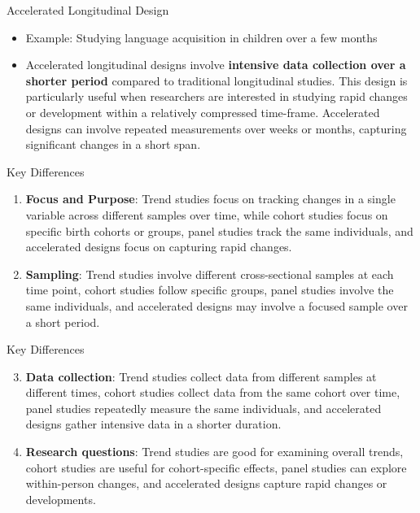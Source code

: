 \documentclass[
  ignorenonframetext,
  aspectratio=169,
]{beamer}
\providecommand{\tightlist}{%
  \setlength{\itemsep}{0pt}\setlength{\parskip}{0pt}}\usepackage{longtable,booktabs,array}
\begin{document}
\begin{frame}{Accelerated Longitudinal Design}
\label{accelerated-longitudinal-design}
\begin{itemize}[<+->]
\tightlist
\item
  Example: Studying language acquisition in children over a few months
\item
  Accelerated longitudinal designs involve \textbf{intensive data
  collection over a shorter period} compared to traditional longitudinal
  studies. This design is particularly useful when researchers are
  interested in studying rapid changes or development within a
  relatively compressed time-frame. Accelerated designs can involve
  repeated measurements over weeks or months, capturing significant
  changes in a short span.
\end{itemize}
\end{frame}

\begin{frame}{Key Differences}
\label{key-differences}
\begin{enumerate}[<+->]
\item
  \textbf{Focus and Purpose}: Trend studies focus on tracking changes in
  a single variable across different samples over time, while cohort
  studies focus on specific birth cohorts or groups, panel studies track
  the same individuals, and accelerated designs focus on capturing rapid
  changes.
\item
  \textbf{Sampling}: Trend studies involve different cross-sectional
  samples at each time point, cohort studies follow specific groups,
  panel studies involve the same individuals, and accelerated designs
  may involve a focused sample over a short period.
\end{enumerate}
\end{frame}

\begin{frame}{Key Differences}
\label{key-differences-1}
\begin{enumerate}[<+->]
\setcounter{enumi}{2}
\item
  \textbf{Data collection}: Trend studies collect data from different
  samples at different times, cohort studies collect data from the same
  cohort over time, panel studies repeatedly measure the same
  individuals, and accelerated designs gather intensive data in a
  shorter duration.
\item
  \textbf{Research questions}: Trend studies are good for examining
  overall trends, cohort studies are useful for cohort-specific effects,
  panel studies can explore within-person changes, and accelerated
  designs capture rapid changes or developments.
\end{enumerate}
\end{frame}
\end{document}
